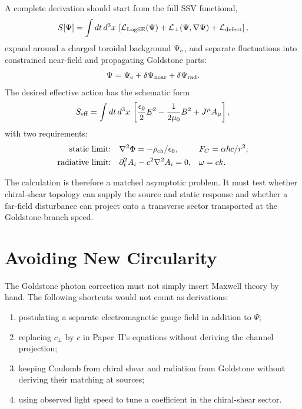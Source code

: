 \documentclass[11pt,a4paper]{article}
\begin{document}
A complete derivation should start from the full SSV functional,
\begin{equation}
    S[\Psi]
    =
    \int dt\,d^3x\,
    \left[
        \mathcal{L}_{\rm LogSE}(\Psi)
        +
        \mathcal{L}_{\perp}(\Psi,\nabla\Psi)
        +
        \mathcal{L}_{\rm defect}
    \right],
    \label{eq:full_action}
\end{equation}
expand around a charged toroidal background $\Psi_{\rm e}$, and separate
fluctuations into constrained near-field and propagating Goldstone parts:
\begin{equation}
    \Psi
    =
    \Psi_{\rm e}
    + \delta\Psi_{\rm near}
    + \delta\Psi_{\rm rad}.
    \label{eq:split}
\end{equation}
The desired effective action has the schematic form
\begin{equation}
    S_{\rm eff}
    =
    \int dt\,d^3x\,
    \left[
      \frac{\epsilon_0}{2}E^2
      -\frac{1}{2\mu_0}B^2
      + J^\mu A_\mu
    \right],
    \label{eq:Seff}
\end{equation}
with two requirements:
\begin{align}
    \hbox{static limit:}\quad
    &\nabla^2\Phi = -\rho_{\rm ch}/\epsilon_0,
    &&F_C=\alpha\hbar c/r^2,\\
    \hbox{radiative limit:}\quad
    &\partial_t^2 A_i - c^2\nabla^2 A_i = 0,
    &&\omega=ck.
    \label{eq:limits}
\end{align}

The calculation is therefore a matched asymptotic problem.  It must test
whether chiral-shear topology can supply the source and static response and
whether a far-field disturbance can project onto a transverse sector
transported at the Goldstone-branch speed.

\section{Avoiding New Circularity}
\label{sec:circularity}

The Goldstone photon correction must not simply insert Maxwell theory by
hand.  The following shortcuts would not count as derivations:
\begin{enumerate}[label=(\roman*)]
    \item postulating a separate electromagnetic gauge field in addition to
          $\Psi$;
    \item replacing $c_\perp$ by $c$ in Paper~II's equations without
          deriving the channel projection;
    \item keeping Coulomb from chiral shear and radiation from Goldstone
          without deriving their matching at sources;
    \item using observed light speed to tune a coefficient in the
          chiral-shear sector.
\end{enumerate}
\end{document}
